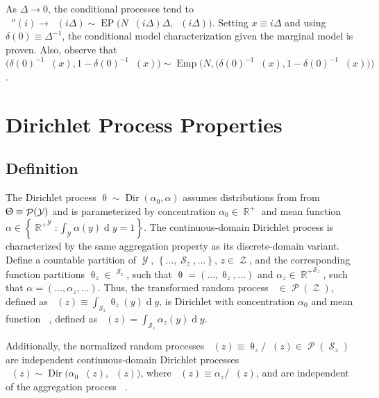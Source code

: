 \documentclass[12pt]{report}
\DeclareMathOperator{\drm}{\mathrm{d}}
\DeclareMathOperator{\Ycal}{\mathcal{Y}}
\DeclareMathOperator{\Zcal}{\mathcal{Z}}
\DeclareMathOperator{\Scal}{\mathcal{S}}
\DeclareMathOperator{\Pcal}{\mathcal{P}}
\DeclareMathOperator{\Rbb}{\mathbb{R}}
\DeclareMathOperator{\Rbbgeq}{\mathbb{R}_{\geq 0}}
\DeclareMathOperator{\Dir}{\mathrm{Dir}}
\DeclareMathOperator{\Emp}{\mathrm{Emp}}
\DeclareMathOperator{\EP}{\mathrm{EP}}
\DeclareMathOperator{\thetam}{\theta_\text{m}}
\DeclareMathOperator{\upthetam}{\uptheta_\text{m}}
\DeclareMathOperator{\upthetac}{\uptheta_\text{c}}
\DeclareMathOperator{\uppsim}{\uppsi_\text{m}}
\DeclareMathOperator{\uppsic}{\uppsi_\text{c}}
\DeclareMathOperator{\alpham}{\alpha_\text{m}}
\DeclareMathOperator{\alphac}{\alpha_\text{c}}
\begin{document}
As $\Delta \to 0$, the conditional processes tend to $\uppsic''(i) \to \uppsic(i \Delta) \sim \EP\big( N \uppsim(i \Delta) \Delta, \uppsic(i \Delta) \big)$. Setting $x \equiv i\Delta$ and using $\delta(0) \equiv \Delta^{-1}$, the conditional model characterization given the marginal model is proven. Also, observe that $\big( \delta(0)^{-1} \uppsim(x),1 - \delta(0)^{-1} \uppsim(x)\big) \sim \Emp\Big( N, \big( \delta(0)^{-1} \thetam(x), 1 - \delta(0)^{-1} \thetam(x)\big) \Big)$.
 





\section{Dirichlet Process Properties} \label{app:DP}


\subsection{Definition}

The Dirichlet process $\uptheta \sim \Dir(\alpha_0,\alpha)$ assumes distributions from from $\Uptheta \equiv \Pcal(\Ycal)$ and is parameterized by concentration $\alpha_0 \in \Rbb^+$ and mean function $\alpha \in \left\{ {\Rbb^+}^{\Ycal} : \int_{\Ycal} \alpha(y) {\drm}y = 1 \right\}$. The continuous-domain Dirichlet process is characterized by the same aggregation property as its discrete-domain variant. Define a countable partition of $\Ycal$, $\left\{ \ldots,\Scal_z,\ldots \right\}$, $z \in \Zcal$, and the corresponding function partitions $\uptheta_z \in \Rbbgeq^{\Scal_z}$, such that $\uptheta = \left( \ldots,\uptheta_z,\ldots \right)$ and $\alpha_z \in {\Rbb^+}^{\Scal_z}$, such that $\alpha = \left( \ldots,\alpha_z,\ldots \right)$. Thus, the transformed random process $\upthetam \in \Pcal(\Zcal)$, defined as $\upthetam(z) \equiv \int_{\Scal_z} \uptheta_z(y) {\drm}y$, is Dirichlet with concentration $\alpha_0$ and mean function $\alpham$, defined as $\alpham(z) = \int_{\Scal_z} \alpha_z(y) {\drm}y$.

Additionally, the normalized random processes $\upthetac(z) \equiv \uptheta_z / \upthetam(z) \in \Pcal(\Scal_z)$ are independent continuous-domain Dirichlet processes $\upthetac(z) \sim \Dir\big(\alpha_0 \alpham(z), \alphac(z)\big)$, where $\alphac(z) \equiv \alpha_z / \alpham(z)$, and are independent of the aggregation process $\upthetam$.
\end{document}
